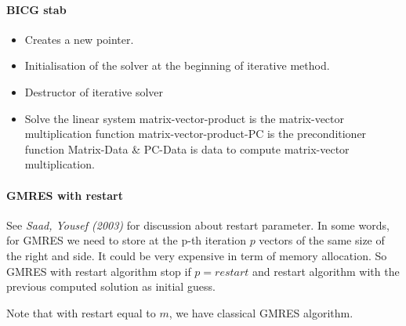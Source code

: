 \paragraph{BICG stab}
\begin{itemize}
\item {}
  \sshortdescribe Creates a new  pointer.  
\item {}
  \sshortdescribe Initialisation of the solver at the beginning of iterative method.  
\item {}
  \sshortdescribe Destructor of iterative solver  
\item {}
  \sshortdescribe Solve the linear system matrix-vector-product is the matrix-vector multiplication function matrix-vector-product-PC is the preconditioner function Matrix-Data \& PC-Data is data to compute matrix-vector multiplication.  
\end{itemize}

\paragraph{GMRES with restart}
See {\em Saad, Yousef (2003)} for discussion about restart parameter. In some
words, for GMRES we need to store at the p-th iteration $p$ vectors of the same size of the right
and side. It could be very expensive in term of memory allocation. So GMRES
with restart algorithm stop if $p=restart$ and restart algorithm with the
previous computed solution as initial guess.

Note that with restart equal to $m$, we have classical GMRES algorithm.

